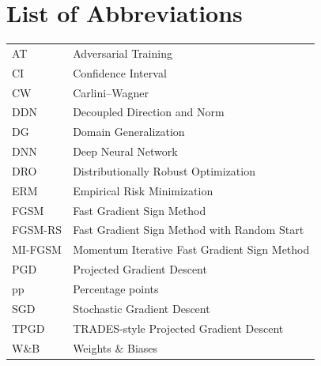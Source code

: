 \tableofcontents
\listoffigures
\listoftables

\chapter*{List of Abbreviations}

\begin{tabular}{ll}
AT        & Adversarial Training \\
CI        & Confidence Interval \\
CW        & Carlini--Wagner \\
DDN       & Decoupled Direction and Norm \\
DG        & Domain Generalization \\
DNN       & Deep Neural Network \\
DRO       & Distributionally Robust Optimization \\
ERM       & Empirical Risk Minimization \\
FGSM      & Fast Gradient Sign Method \\
FGSM-RS   & Fast Gradient Sign Method with Random Start \\
MI-FGSM   & Momentum Iterative Fast Gradient Sign Method \\
PGD       & Projected Gradient Descent \\
pp        & Percentage points \\
SGD       & Stochastic Gradient Descent \\
TPGD      & TRADES-style Projected Gradient Descent \\
W\&B      & Weights \& Biases \\
\end{tabular}

\cleardoublepage
